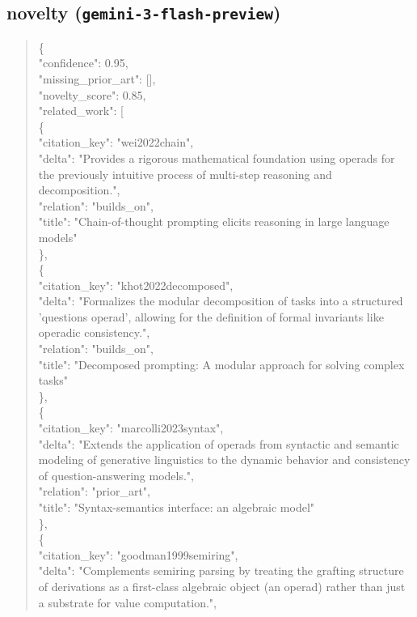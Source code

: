 \documentclass[11pt]{article}
\begin{document}
\subsection*{novelty (\texttt{gemini-3-flash-preview})}
\begin{quote}\small\ttfamily\raggedright
\{\\
  "confidence": 0.95,\\
  "missing\_prior\_art": [],\\
  "novelty\_score": 0.85,\\
  "related\_work": [\\
    \{\\
      "citation\_key": "wei2022chain",\\
      "delta": "Provides a rigorous mathematical foundation using operads for the previously intuitive process of multi-step reasoning and decomposition.",\\
      "relation": "builds\_on",\\
      "title": "Chain-of-thought prompting elicits reasoning in large language models"\\
    \},\\
    \{\\
      "citation\_key": "khot2022decomposed",\\
      "delta": "Formalizes the modular decomposition of tasks into a structured 'questions operad', allowing for the definition of formal invariants like operadic consistency.",\\
      "relation": "builds\_on",\\
      "title": "Decomposed prompting: A modular approach for solving complex tasks"\\
    \},\\
    \{\\
      "citation\_key": "marcolli2023syntax",\\
      "delta": "Extends the application of operads from syntactic and semantic modeling of generative linguistics to the dynamic behavior and consistency of question-answering models.",\\
      "relation": "prior\_art",\\
      "title": "Syntax-semantics interface: an algebraic model"\\
    \},\\
    \{\\
      "citation\_key": "goodman1999semiring",\\
      "delta": "Complements semiring parsing by treating the grafting structure of derivations as a first-class algebraic object (an operad) rather than just a substrate for value computation.",\\

\end{quote}
\end{document}
